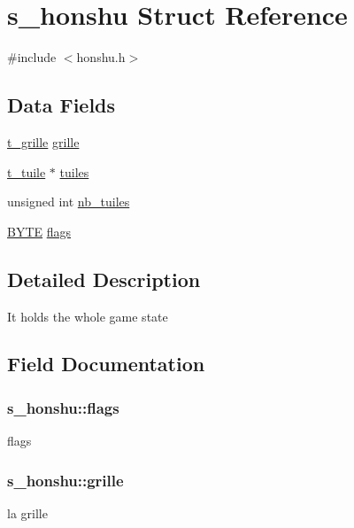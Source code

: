 \hypertarget{structs__honshu}{}\section{s\+\_\+honshu Struct Reference}
\label{structs__honshu}


{\ttfamily \#include $<$honshu.\+h$>$}

\subsection*{Data Fields}
\begin{DoxyCompactItemize}
\item 
\hyperlink{structs__grille}{t\+\_\+grille} \hyperlink{structs__honshu_acb56018a76f879eaf840281ef7522628}{grille}
\item 
\hyperlink{structs__tuile}{t\+\_\+tuile} $\ast$ \hyperlink{structs__honshu_a4c362445c66116bf7fab7917489425fe}{tuiles}
\item 
unsigned int \hyperlink{structs__honshu_a44729b65a4628d7f765ab50469ed8dd4}{nb\+\_\+tuiles}
\item 
\hyperlink{types_8h_aec93e83855ac17c3c25c55c37ca186dd}{B\+Y\+TE} \hyperlink{structs__honshu_a3b5f869819428973745541c16b5d7c1a}{flags}
\end{DoxyCompactItemize}


\subsection{Detailed Description}
It holds the whole game state 

\subsection{Field Documentation}
\subsubsection[{\texorpdfstring{flags}{flags}}]{ s\+\_\+honshu\+::flags}\hypertarget{structs__honshu_a3b5f869819428973745541c16b5d7c1a}{}\label{structs__honshu_a3b5f869819428973745541c16b5d7c1a}
flags 
\subsubsection[{\texorpdfstring{grille}{grille}}]{ s\+\_\+honshu\+::grille}\hypertarget{structs__honshu_acb56018a76f879eaf840281ef7522628}{}\label{structs__honshu_acb56018a76f879eaf840281ef7522628}
la grille 
